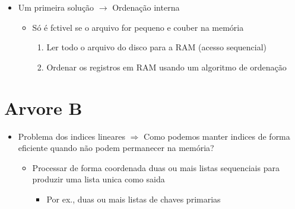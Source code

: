\documentclass[12pt]{article}
\begin{document}
\begin{itemize}
\begin{itemize}
\begin{itemize}
                inserção no arquivo em memoria e regravar o disco
            \end{itemize}
        \end{itemize}
        \item Um primeira solução $\rightarrow$ Ordenação interna
        \begin{itemize}
            \item Só é fctivel se o arquivo for pequeno e couber na memória
            \begin{enumerate}
                \item Ler todo o arquivo do disco para a RAM (acesso sequencial)
                \item Ordenar os registros em RAM usando um algoritmo de 
                ordenação
            \end{enumerate}
        \end{itemize}
    \end{itemize}

\section{Arvore B}
\begin{itemize}
    \item Problema dos indices lineares $\Rightarrow$ Como podemos manter 
    indices de forma eficiente quando não podem permanecer na memória?
    \begin{itemize}
        \item Processar de forma coordenada duas ou mais listas sequenciais 
        para produzir uma lista unica como saida
        \begin{itemize}
            \item Por ex., duas ou mais listas de chaves primarias
        \end{itemize}
    \end{itemize}
\end{itemize}
\end{document}
